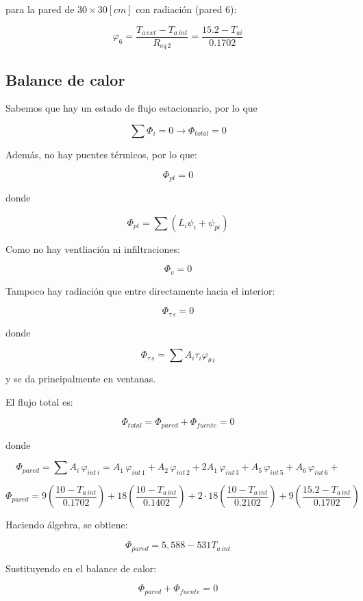 \documentclass[11pt]{article}
\begin{document}
para la pared de $ 30 \times 30 \left[ cm \right] $ con radiación (pared 6):

\[ \varphi _6 = \frac{ T_{ a \, ext } - T_{ a \, int } }{ R_{ eq \, 2 } } = \frac{ 15.2 - T_{ ai } }{ 0.1702 } \]

\subsection{Balance de calor}

Sabemos que hay un estado de flujo estacionario, por lo que

\[  \sum{ \Phi _i } = 0 \longrightarrow \Phi _{ total } = 0 \]

Además, no hay puentes térmicos, por lo que:

\[ \Phi _{ pt } = 0 \]

donde

\[ \Phi _{ pt } = \sum{ \left( L_i \psi _i + \psi _{ pi } \right) }  \]

Como no hay ventliación ni infiltraciones:

\[ \Phi _v = 0 \]

Tampoco hay radiación que entre directamente hacia el interior:

\[ \Phi _{ \tau \, s } = 0 \]

donde

\[ \Phi _{ \tau \, s } = \sum{ A_i \tau _i \varphi _{ \theta \, i } } \]

y se da principalmente en ventanas.

El flujo total es:

\[ \Phi _{ total } = \Phi _{ pared } + \Phi _{ fuente } = 0 \]

donde

\[ \Phi _{ pared } = \sum{ A_i \, \varphi _{ int \, i } } = A_1 \, \varphi _{ int \, 1 } + A_2 \, \varphi _{ int \, 2 } + 2 A_1 \, \varphi _{ int \, 3 } + A_5 \, \varphi _{ int \, 5 } + A_6 \, \varphi _{ int \, 6 } + \]

\[ \Phi _{ pared } = 9 \left( \frac{ 10 - T_{ a \, int } }{ 0.1702 } \right) + 18 \left( \frac{ 10 - T_{ a \, int } }{ 0.1402 } \right) + 2 \cdot 18 \left( \frac{ 10 - T_{ a \, int } }{ 0.2102 } \right) + 9 \left( \frac{ 15.2 - T_{ a \, int } }{ 0.1702 } \right) \]

Haciendo álgebra, se obtiene:

\[ \Phi _{ pared } = 5,588 - 531 T_{ a \, int } \]

Sustituyendo en el balance de calor:

\[ \Phi _{ pared } + \Phi _{ fuente } = 0 \]
\end{document}

